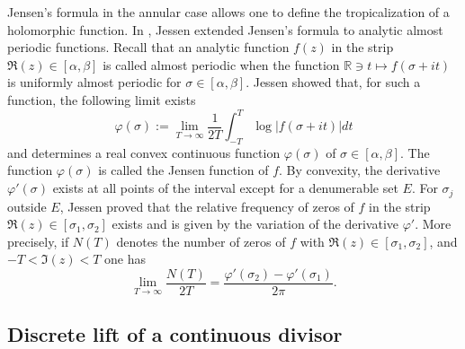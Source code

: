 \documentclass[graybox, envcountsect%
]{svmult}
\def\R{{\mathbb R}}
\begin{document}
Jensen's formula in the annular case  
allows one to define the tropicalization of a holomorphic function. In \cite{jessen33}, Jessen   extended Jensen's formula to analytic almost periodic functions.\newline
Recall that an analytic function $f(z)$ in the strip $\Re(z)\in [\alpha,\beta]$ is called almost periodic when the function  $\R\ni t\mapsto f(\sigma+it)$ is uniformly almost periodic for $\sigma  \in [\alpha,\beta]$. \newline Jessen showed that, for such a function,  the following limit exists
\begin{equation}\label{jessen1}
	\varphi(\sigma):=\lim_{T\to \infty}\frac {1}{2T}\int_{-T}^T \log\vert f(\sigma+it)\vert dt
\end{equation}
and determines a real convex continuous function $\varphi(\sigma)$ of $\sigma  \in [\alpha,\beta]$. The function $\varphi(\sigma)$ is called the Jensen function of $f$. By convexity, the  derivative $\varphi'(\sigma)$ exists at all points of the interval except for a denumerable set $E$. For $\sigma_j$ outside $E$, Jessen proved that the relative frequency of zeros of $f$ in the strip  $\Re(z)\in [\sigma_1,\sigma_2]$ exists and is given by the variation of the derivative $\varphi'$. More precisely, if $N(T)$ denotes the number of zeros of $f$ with $\Re(z)\in [\sigma_1,\sigma_2]$, and $-T<\Im(z)<T$ one has 
\begin{equation}\label{jessen2}
\lim_{T\to \infty}\frac{N(T)}{2T}= \frac{\varphi'(\sigma_2)-\varphi'(\sigma_1)}{2\pi}.
\end{equation}


\subsection{Discrete lift of a continuous divisor}\label{subsec:4.3}
\end{document}
